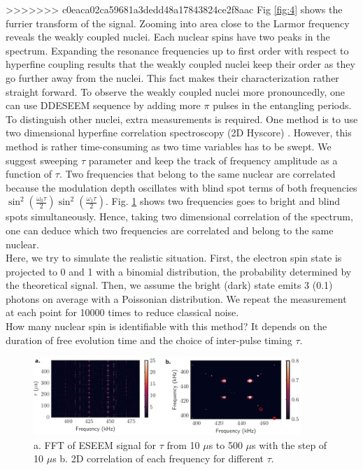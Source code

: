 \documentclass[%
 reprint,
superscriptaddress,
 amsmath,amssymb,
 aps,
]{revtex4-2}
\begin{document}
>>>>>>> c0eaca02ca59681a3dedd48a17843824ce2f8aac
Fig \ref{fig:4} shows the furrier transform of the signal. Zooming into area close to the Larmor frequency reveals the weakly coupled nuclei. Each nuclear spins have two peaks in the spectrum. Expanding the resonance frequencies up to first order with respect to hyperfine coupling results that the weakly coupled nuclei keep their order as they go further away from the nuclei. This fact makes their characterization rather straight forward. To observe the weakly coupled nuclei more pronouncedly, one can use DDESEEM sequence by adding more $\pi$ pulses in the entangling periods. To distinguish other nuclei, extra measurements is required. One method is to use two dimensional hyperfine correlation spectroscopy (2D Hyscore)  \cite{vorobyov2022addressing}. However, this method is rather time-consuming as two time variables has to be swept. We suggest sweeping $\tau$ parameter and keep the track of frequency amplitude as a function of $\tau$. Two frequencies that belong to the same nuclear are correlated because the modulation depth oscillates with blind spot terms of both frequencies $\sin^2(\frac{\omega_0 \tau}{2}) \sin^2(\frac{\omega_1 \tau}{2})$. Fig. \ref{fig:5} shows two frequencies goes to bright and blind spots simultaneously. Hence, taking two dimensional correlation of the spectrum, one can deduce which two frequencies are correlated and belong to the same nuclear. \\

Here, we try to simulate the realistic situation. First, the electron spin state is projected to 0 and 1 with a binomial distribution, the probability determined by the theoretical signal. Then, we assume the bright (dark) state emits 3 (0.1) photons on average with a Poissonian distribution. We repeat the measurement at each point for 10000 times to reduce classical noise.\\
How many nuclear spin is identifiable with this method? It depends on the duration of free evolution time and the choice of inter-pulse timing $\tau$.

\begin{figure}%
	\begin{center}
		\includegraphics[width=0.9\textwidth]{pict/fig5.png}
		\caption{a. FFT of ESEEM signal for $\tau$ from 10 $\mu$s to 500 $\mu$s with the step of 10 $\mu$s b. 2D correlation of each frequency for different $\tau$.}
		\label{fig:5}
	\end{center}
\end{figure}
\end{document}

